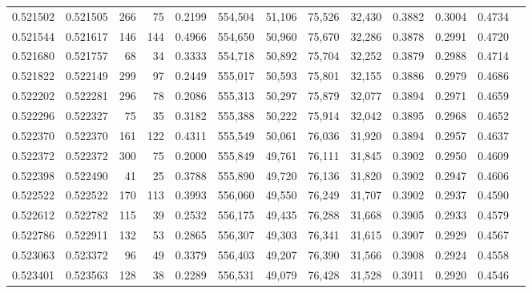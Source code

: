 \begin{tabular}{rrrrrrrrrrrrr}
0.521502 & 0.521505 &   266 &    75 &                                     0.2199 & 554,504 &  51,106 &  75,526 &  32,430 & 0.3882 & 0.3004 & 0.4734 \\
0.521544 & 0.521617 &   146 &   144 &                                     0.4966 & 554,650 &  50,960 &  75,670 &  32,286 & 0.3878 & 0.2991 & 0.4720 \\
0.521680 & 0.521757 &    68 &    34 &                                     0.3333 & 554,718 &  50,892 &  75,704 &  32,252 & 0.3879 & 0.2988 & 0.4714 \\
0.521822 & 0.522149 &   299 &    97 &                                     0.2449 & 555,017 &  50,593 &  75,801 &  32,155 & 0.3886 & 0.2979 & 0.4686 \\
0.522202 & 0.522281 &   296 &    78 &                                     0.2086 & 555,313 &  50,297 &  75,879 &  32,077 & 0.3894 & 0.2971 & 0.4659 \\
0.522296 & 0.522327 &    75 &    35 &                                     0.3182 & 555,388 &  50,222 &  75,914 &  32,042 & 0.3895 & 0.2968 & 0.4652 \\
0.522370 & 0.522370 &   161 &   122 &                                     0.4311 & 555,549 &  50,061 &  76,036 &  31,920 & 0.3894 & 0.2957 & 0.4637 \\
0.522372 & 0.522372 &   300 &    75 &                                     0.2000 & 555,849 &  49,761 &  76,111 &  31,845 & 0.3902 & 0.2950 & 0.4609 \\
0.522398 & 0.522490 &    41 &    25 &                                     0.3788 & 555,890 &  49,720 &  76,136 &  31,820 & 0.3902 & 0.2947 & 0.4606 \\
0.522522 & 0.522522 &   170 &   113 &                                     0.3993 & 556,060 &  49,550 &  76,249 &  31,707 & 0.3902 & 0.2937 & 0.4590 \\
0.522612 & 0.522782 &   115 &    39 &                                     0.2532 & 556,175 &  49,435 &  76,288 &  31,668 & 0.3905 & 0.2933 & 0.4579 \\
0.522786 & 0.522911 &   132 &    53 &                                     0.2865 & 556,307 &  49,303 &  76,341 &  31,615 & 0.3907 & 0.2929 & 0.4567 \\
0.523063 & 0.523372 &    96 &    49 &                                     0.3379 & 556,403 &  49,207 &  76,390 &  31,566 & 0.3908 & 0.2924 & 0.4558 \\
0.523401 & 0.523563 &   128 &    38 &                                     0.2289 & 556,531 &  49,079 &  76,428 &  31,528 & 0.3911 & 0.2920 & 0.4546 \\

\end{tabular}
